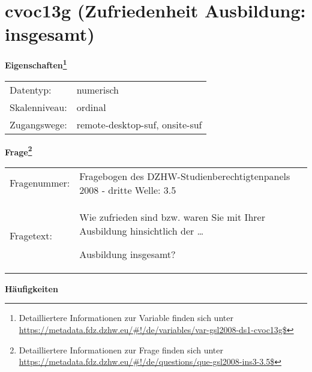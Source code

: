 
    \setcounter{footnote}{0}

    \vspace*{-1.8cm}
	\section{cvoc13g (Zufriedenheit Ausbildung: insgesamt)}
	\label{section:cvoc13g}



    \vspace*{0.5cm}
    \noindent\textbf{Eigenschaften\footnote{Detailliertere Informationen zur Variable finden sich unter
		\url{https://metadata.fdz.dzhw.eu/\#!/de/variables/var-gsl2008-ds1-cvoc13g$}}}\\
	\begin{tabularx}{\hsize}{@{}lX}
	Datentyp: & numerisch \\
	Skalenniveau: & ordinal \\
	Zugangswege: &
	  remote-desktop-suf, 
	  onsite-suf
 \\
    \end{tabularx}



				\vspace*{0.5cm}
                \noindent\textbf{Frage\footnote{Detailliertere Informationen zur Frage finden sich unter
		              \url{https://metadata.fdz.dzhw.eu/\#!/de/questions/que-gsl2008-ins3-3.5$}}}\\
				\begin{tabularx}{\hsize}{@{}lX}
					Fragenummer: &
					  Fragebogen des DZHW-Studienberechtigtenpanels 2008 - dritte Welle:
					  3.5
 \\
					Fragetext: & Wie zufrieden sind bzw. waren Sie mit Ihrer Ausbildung hinsichtlich der …\par  Ausbildung insgesamt? \\
				\end{tabularx}





        		\vspace*{0.5cm}
                \noindent\textbf{Häufigkeiten}

